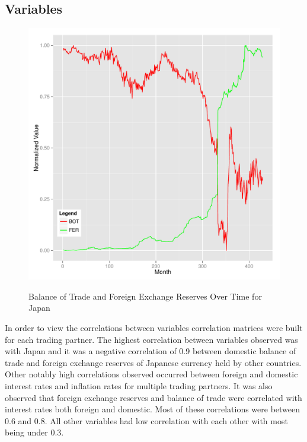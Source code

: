 \documentclass{sig-alternate-05-2015}
\begin{document}

\subsection{Variables}

\begin{figure}
\centering
\caption{Balance of Trade and Foreign Exchange Reserves Over Time for Japan}
\includegraphics[scale=0.45]{japan_plot.pdf}
\label{fig:autocorrelation}
\end{figure}

In order to view the correlations between variables correlation matrices were built for each trading partner. The highest correlation between variables observed was with Japan and it was a negative correlation of 0.9 between domestic balance of trade and foreign exchange reserves of Japanese currency held by other countries. Other notably high correlations observed occurred between foreign and domestic interest rates and inflation rates for multiple trading partners. It was also observed that foreign exchange reserves and balance of trade were correlated with interest rates both foreign and domestic. Most of these correlations were between 0.6 and 0.8. All other variables had low correlation with each other with most being under 0.3.   
\end{document}

